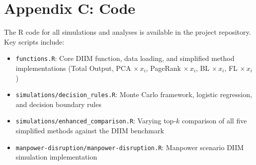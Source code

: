 \chapter*{Appendix C: Code}

The R code for all simulations and analyses is available in the project repository. Key scripts include:

\begin{itemize}
    \item \texttt{functions.R}: Core DIIM function, data loading, and simplified method implementations (Total Output, PCA $\times\, x_i$, PageRank $\times\, x_i$, BL $\times\, x_i$, FL $\times\, x_i$)
    \item \texttt{simulations/decision\_rules.R}: Monte Carlo framework, logistic regression, and decision boundary rules
    \item \texttt{simulations/enhanced\_comparison.R}: Varying top-$k$ comparison of all five simplified methods against the DIIM benchmark
    \item \texttt{manpower-disruption/manpower-disruption.R}: Manpower scenario DIIM simulation implementation
\end{itemize}


\newpage
